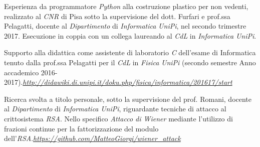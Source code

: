 \documentclass[10pt]{article} %
\begin{document}
%    

Esperienza da programmatore \textit{Python} alla costruzione plastico per non vedenti, realizzato al \textit{CNR} di Pisa sotto la supervisione del dott. Furfari e prof.ssa Pelagatti, docente al \textit{Dipartimento} di \textit{Informatica} \textit{UniPi}, nel secondo trimestre 2017. Esecuzione in coppia con un collega laureando al \textit{CdL} in \textit{Informatica} \textit{UniPi}.

\medskip
Supporto alla didattica come assistente di laboratorio \textit{C} dell'esame di Informatica tenuto dalla prof.ssa Pelagatti per il \textit{CdL} in \textit{Fisica} \textit{UniPi} (secondo semestre Anno accademico 2016-2017).\hfill\href{http://didawiki.di.unipi.it/doku.php/fisica/informatica/201617/start}{\textit{http://didawiki.di.unipi.it/doku.php/fisica/informatica/201617/start}}

\medskip
Ricerca svolta a titolo personale, sotto la supervisione del prof. Romani, docente al \textit{Dipartimento} di \textit{Informatica} \textit{UniPi}, riguardante tecniche di attacco al crittosistema \textit{RSA}. Nello specifico \textit{Attacco di Wiener} mediante l'utilizzo di frazioni continue per la fattorizzazione del modulo dell'\textit{RSA}.\hfill\href{https://github.com/MatteoGiorgi/wiener_attack}{\textit{https://github.com/MatteoGiorgi/wiener\_attack}}




\end{document}
